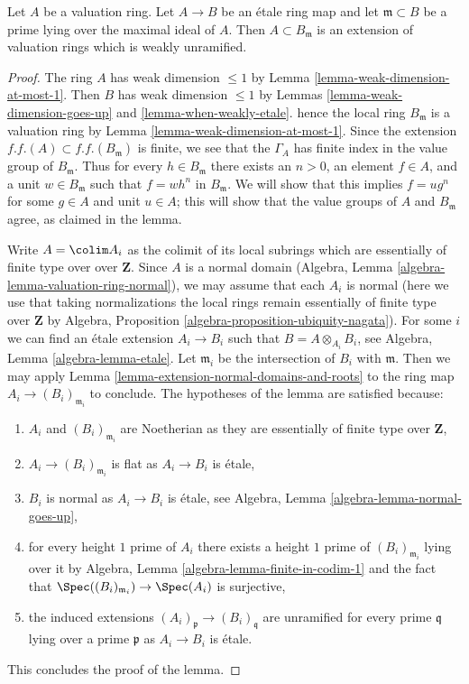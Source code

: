 \begin{lemma}
\label{lemma-etale-extension-valuation-ring}
Let $A$ be a valuation ring. Let $A \to B$ be an \'etale ring map
and let $\mathfrak m \subset B$ be a prime lying over the maximal
ideal of $A$. Then $A \subset B_\mathfrak m$ is an extension of
valuation rings which is weakly unramified.
\end{lemma}

\begin{proof}
The ring $A$ has weak dimension $\leq 1$ by
Lemma \ref{lemma-weak-dimension-at-most-1}. Then $B$ has weak dimension
$\leq 1$ by Lemmas \ref{lemma-weak-dimension-goes-up} and
\ref{lemma-when-weakly-etale}. hence the local ring $B_\mathfrak m$
is a valuation ring by Lemma \ref{lemma-weak-dimension-at-most-1}.
Since the extension $f.f.(A) \subset f.f.(B_\mathfrak m)$ is finite,
we see that the $\Gamma_A$ has finite index in the value group of
$B_{\mathfrak m}$. Thus for every $h \in B_\mathfrak m$ there exists
an $n > 0$, an element $f \in A$, and a unit $w \in B_\mathfrak m$
such that $f = w h^n$ in $B_\mathfrak m$. We will show that this implies
$f = ug^n$ for some $g \in A$ and unit $u \in A$; this will show that
the value groups of $A$ and $B_\mathfrak m$ agree, as claimed in the lemma.

\medskip\noindent
Write $A = \colim A_i$ as the colimit of its local subrings which
are essentially of finite type over over $\mathbf{Z}$. Since $A$
is a normal domain (Algebra, Lemma \ref{algebra-lemma-valuation-ring-normal}),
we may assume that each $A_i$ is normal (here we use that taking
normalizations the local rings remain essentially of finite type
over $\mathbf{Z}$ by
Algebra, Proposition \ref{algebra-proposition-ubiquity-nagata}).
For some $i$ we can find an \'etale extension $A_i \to B_i$
such that $B = A \otimes_{A_i} B_i$, see
Algebra, Lemma \ref{algebra-lemma-etale}.
Let $\mathfrak m_i$ be the intersection of $B_i$ with $\mathfrak m$.
Then we may apply Lemma \ref{lemma-extension-normal-domains-and-roots}
to the ring map $A_i \to (B_i)_{\mathfrak m_i}$ to conclude.
The hypotheses of the lemma are satisfied because:
\begin{enumerate}
\item $A_i$ and $(B_i)_{\mathfrak m_i}$ are Noetherian as they are
essentially of finite type over $\mathbf{Z}$,
\item $A_i \to (B_i)_{\mathfrak m_i}$ is flat as $A_i \to B_i$ is \'etale,
\item $B_i$ is normal as $A_i \to B_i$ is \'etale, see
Algebra, Lemma \ref{algebra-lemma-normal-goes-up},
\item for every height $1$ prime of $A_i$ there exists a height $1$
prime of $(B_i)_{\mathfrak m_i}$ lying over it by
Algebra, Lemma \ref{algebra-lemma-finite-in-codim-1} and the fact that
$\Spec((B_i)_{\mathfrak m_i}) \to \Spec(A_i)$ is surjective,
\item the induced extensions $(A_i)_\mathfrak p \to (B_i)_\mathfrak q$
are unramified for every prime $\mathfrak q$ lying over a prime
$\mathfrak p$ as $A_i \to B_i$ is \'etale.
\end{enumerate}
This concludes the proof of the lemma.
\end{proof}

